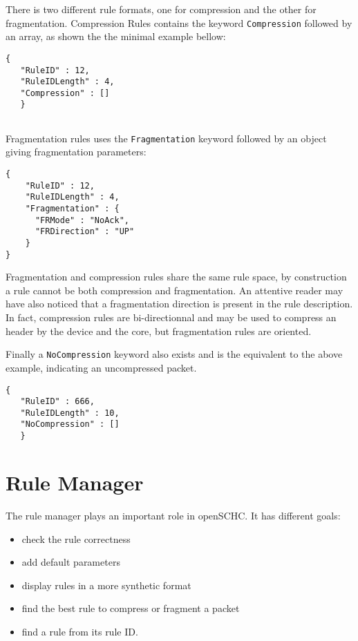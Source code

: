 There is two different rule formats, one for compression and the other for fragmentation. Compression Rules contains the keyword \texttt{Compression} followed by an array, as shown the the minimal example bellow: 

\begin{lstlisting}[backgroundcolor=\color{yellow}]
   {
   "RuleID" : 12,
   "RuleIDLength" : 4,
   "Compression" : []
   }
   
\end{lstlisting}

   
Fragmentation rules uses the \texttt{Fragmentation} keyword followed by an object giving fragmentation parameters:

\begin{lstlisting}[backgroundcolor=\color{yellow}]
    {
    "RuleID" : 12,
    "RuleIDLength" : 4,
    "Fragmentation" : {
      "FRMode" : "NoAck",
      "FRDirection" : "UP"
    }
}
\end{lstlisting}

Fragmentation and compression rules share the same rule space, by construction a rule cannot be both compression and fragmentation. 
An attentive reader may have also noticed that a fragmentation direction is present in the rule description. 
In fact, compression rules are bi-directionnal and may be used to compress an header by the device and the core, but fragmentation rules are oriented.  

Finally a \texttt{NoCompression} keyword also exists and is the equivalent to the above example, indicating an uncompressed packet.

\begin{lstlisting}[backgroundcolor=\color{yellow}]
   {
   "RuleID" : 666,
   "RuleIDLength" : 10,
   "NoCompression" : []
   }
\end{lstlisting}


\section{Rule Manager}

The rule manager plays an important role in openSCHC. It has different goals:
\begin{itemize}
    \item check the rule correctness
    \item add default parameters
    \item display rules in a more synthetic format
    \item find the best rule to compress or fragment a packet
    \item find a rule from its rule ID.
\end{itemize}

